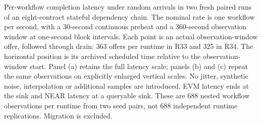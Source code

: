 \caption{Per-workflow completion latency under random arrivals in two fresh paired runs of an eight-contract stateful dependency chain. The nominal rate is one workflow per second, with a 30-second continuous preheat and a 360-second observation window at one-second block intervals. Each point is an actual observation-window offer, followed through drain: 363 offers per runtime in R33 and 325 in R34. The horizontal position is its archived scheduled time relative to the observation-window start. Panel (a) retains the full latency scale; panels (b) and (c) repeat the same observations on explicitly enlarged vertical scales. No jitter, synthetic noise, interpolation or additional samples are introduced. EVM latency ends at the sink and NEAR latency at a queryable sink. These are 688 nested workflow observations per runtime from two seed pairs, not 688 independent runtime replications. Migration is excluded.}
